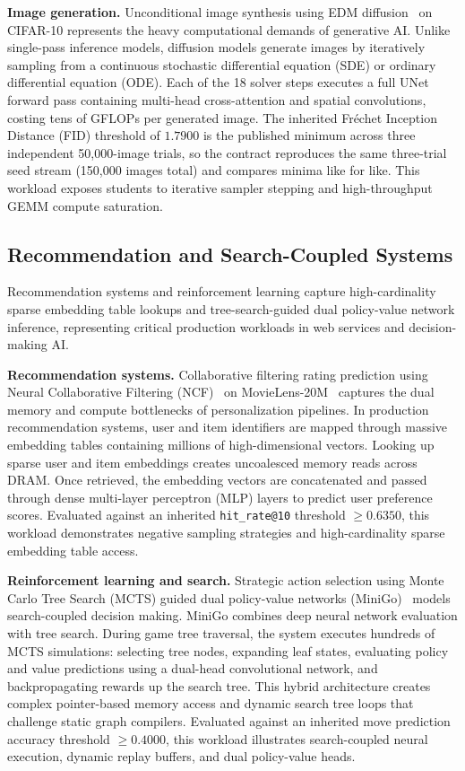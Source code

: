 \documentclass[10pt,twocolumn]{article}
\begin{document}
\textbf{Image generation.} Unconditional image synthesis using EDM diffusion~\citep{karras2022edm} on CIFAR-10 represents the heavy computational demands of generative AI. Unlike single-pass inference models, diffusion models generate images by iteratively sampling from a continuous stochastic differential equation (SDE) or ordinary differential equation (ODE). Each of the 18 solver steps executes a full UNet forward pass containing multi-head cross-attention and spatial convolutions, costing tens of GFLOPs per generated image. The inherited Fréchet Inception Distance (FID) threshold of $1.7900$ is the published minimum across three independent 50,000-image trials, so the contract reproduces the same three-trial seed stream (150,000 images total) and compares minima like for like. This workload exposes students to iterative sampler stepping and high-throughput GEMM compute saturation.

\subsection{Recommendation and Search-Coupled Systems}
\label{sec:suite_recsys}

Recommendation systems and reinforcement learning capture high-cardinality sparse embedding table lookups and tree-search-guided dual policy-value network inference, representing critical production workloads in web services and decision-making AI.

\textbf{Recommendation systems.} Collaborative filtering rating prediction using Neural Collaborative Filtering (NCF)~\citep{he2017ncf} on MovieLens-20M~\citep{harper2015movielens} captures the dual memory and compute bottlenecks of personalization pipelines. In production recommendation systems, user and item identifiers are mapped through massive embedding tables containing millions of high-dimensional vectors. Looking up sparse user and item embeddings creates uncoalesced memory reads across DRAM. Once retrieved, the embedding vectors are concatenated and passed through dense multi-layer perceptron (MLP) layers to predict user preference scores. Evaluated against an inherited \texttt{hit\_rate@10} threshold $\ge 0.6350$, this workload demonstrates negative sampling strategies and high-cardinality sparse embedding table access.

\textbf{Reinforcement learning and search.} Strategic action selection using Monte Carlo Tree Search (MCTS) guided dual policy-value networks (MiniGo)~\citep{minigo2018,silver2016alphago} models search-coupled decision making. MiniGo combines deep neural network evaluation with tree search. During game tree traversal, the system executes hundreds of MCTS simulations: selecting tree nodes, expanding leaf states, evaluating policy and value predictions using a dual-head convolutional network, and backpropagating rewards up the search tree. This hybrid architecture creates complex pointer-based memory access and dynamic search tree loops that challenge static graph compilers. Evaluated against an inherited move prediction accuracy threshold $\ge 0.4000$, this workload illustrates search-coupled neural execution, dynamic replay buffers, and dual policy-value heads.
\end{document}
